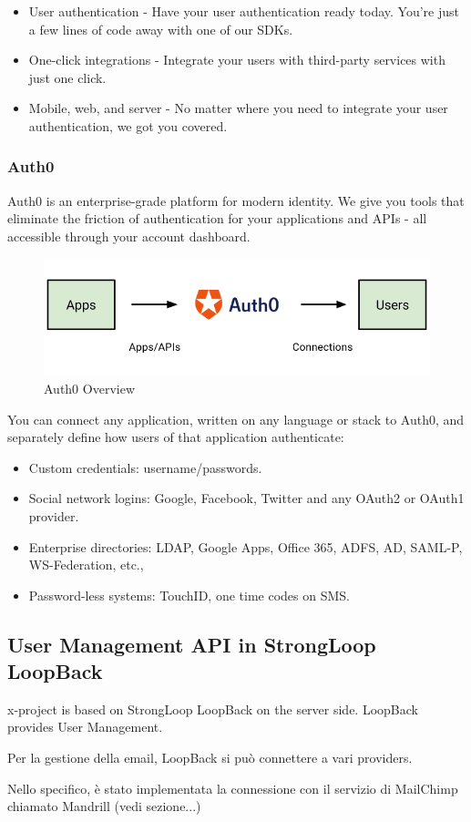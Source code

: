 \begin{itemize}
\item User authentication - Have your user authentication ready today. You're just a few lines of code away with one of our SDKs.
\item One-click integrations - Integrate your users with third-party services with just one click.
\item Mobile, web, and server - No matter where you need to integrate your user authentication, we got you covered.
\end{itemize}

\subsubsection{Auth0}

Auth0 is an enterprise-grade platform for modern identity.
We give you tools that eliminate the friction of authentication for your applications and APIs - all accessible through your account dashboard.\cite{usr_auth0}

\begin {figure}[h]
\graphicspath{{images/chapter_USR/}}
\includegraphics[width=\textwidth]{auth0}
\caption{Auth0 Overview}
\end {figure}

You can connect any application, written on any language or stack to Auth0, and separately define how users of that application authenticate:

\begin{itemize}
\item Custom credentials: username/passwords.
\item Social network logins: Google, Facebook, Twitter and any OAuth2 or OAuth1 provider.
\item Enterprise directories: LDAP, Google Apps, Office 365, ADFS, AD, SAML-P, WS-Federation, etc.,
\item Password-less systems: TouchID, one time codes on SMS.
\end{itemize}


\subsection{User Management API in StrongLoop LoopBack}

x-project is based on StrongLoop LoopBack on the server side.
LoopBack provides User Management.


Per la gestione della email, LoopBack si può connettere a vari providers.

Nello specifico, è stato implementata la connessione con il servizio di MailChimp chiamato Mandrill (vedi sezione...)
